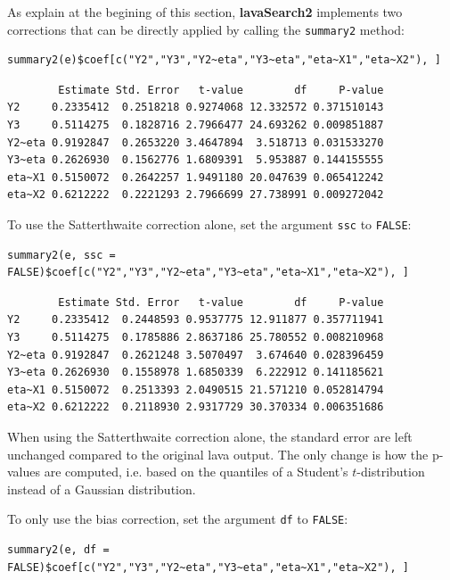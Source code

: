 \documentclass[12pt]{article}
\begin{document}
As explain at the begining of this section, \textbf{lavaSearch2} implements
two corrections that can be directly applied by calling the \texttt{summary2}
method:
\lstset{language=r,label= ,caption= ,captionpos=b,numbers=none}
\begin{lstlisting}
summary2(e)$coef[c("Y2","Y3","Y2~eta","Y3~eta","eta~X1","eta~X2"), ]
\end{lstlisting}

\begin{verbatim}
        Estimate Std. Error   t-value        df     P-value
Y2     0.2335412  0.2518218 0.9274068 12.332572 0.371510143
Y3     0.5114275  0.1828716 2.7966477 24.693262 0.009851887
Y2~eta 0.9192847  0.2653220 3.4647894  3.518713 0.031533270
Y3~eta 0.2626930  0.1562776 1.6809391  5.953887 0.144155555
eta~X1 0.5150072  0.2642257 1.9491180 20.047639 0.065412242
eta~X2 0.6212222  0.2221293 2.7966699 27.738991 0.009272042
\end{verbatim}


To use the Satterthwaite correction alone, set the argument
  \texttt{ssc} to \texttt{FALSE}:

\lstset{language=r,label= ,caption= ,captionpos=b,numbers=none}
\begin{lstlisting}
summary2(e, ssc = FALSE)$coef[c("Y2","Y3","Y2~eta","Y3~eta","eta~X1","eta~X2"), ]
\end{lstlisting}

\begin{verbatim}
        Estimate Std. Error   t-value        df     P-value
Y2     0.2335412  0.2448593 0.9537775 12.911877 0.357711941
Y3     0.5114275  0.1785886 2.8637186 25.780552 0.008210968
Y2~eta 0.9192847  0.2621248 3.5070497  3.674640 0.028396459
Y3~eta 0.2626930  0.1558978 1.6850339  6.222912 0.141185621
eta~X1 0.5150072  0.2513393 2.0490515 21.571210 0.052814794
eta~X2 0.6212222  0.2118930 2.9317729 30.370334 0.006351686
\end{verbatim}


When using the Satterthwaite correction alone, the standard error are
left unchanged compared to the original lava output. The only change
is how the p-values are computed, i.e. based on the quantiles of a
Student's \(t\)-distribution instead of a Gaussian distribution. 

To only use the bias correction, set the argument \texttt{df} to \texttt{FALSE}:
\lstset{language=r,label= ,caption= ,captionpos=b,numbers=none}
\begin{lstlisting}
summary2(e, df = FALSE)$coef[c("Y2","Y3","Y2~eta","Y3~eta","eta~X1","eta~X2"), ]
\end{lstlisting}
\end{document}
